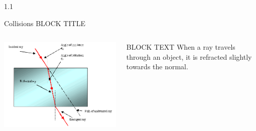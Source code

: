 \documentclass[final]{beamer}
\theoremstyle{plain}
\theoremstyle{definition}
\theoremstyle{remark}
\newlength{\threecolwid}
\begin{document}
\begin{frame}[t]
\begin{columns}[t]
\begin{column}{1.1\threecolwid}
\begin{block}{Collisions BLOCK TITLE
}
\begin{columns}
\begin{column}{0.5\linewidth}
\includegraphics[scale=0.5]{Refraction.png} 
\cite{Refraction} 
\end{column}
\begin{column}{0.5\linewidth}
BLOCK TEXT
When a ray travels through an object, it is refracted slightly towards the normal.
\end{column}
\end{columns}
\end{block}
\vspace{1.5cm}


\end{column}
\end{columns}
\end{frame}
\end{document}
